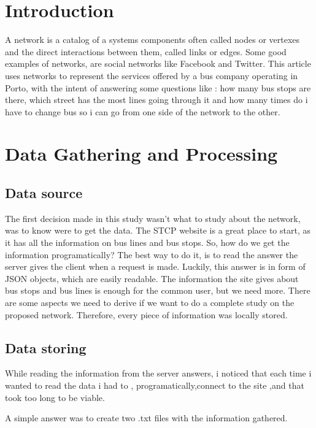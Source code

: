 \documentclass[12pt]{article}
\begin{document}
\begin{multicols}{2}
\section{Introduction}

A network is a catalog of a system\textsc{}s components often called nodes or vertexes and the direct interactions between them, called links or edges.
Some good examples of networks, are social networks like Facebook and Twitter.
This article uses networks to represent the services offered by a bus company operating in Porto, with the intent of answering some questions like : how many bus stops are there, which street has the most lines going through it and how many times do i have to change bus so i can go from one side of the network to the other. 
 

\section{Data Gathering and Processing}

\subsection{Data source}
The first decision made in this study wasn't what to study about the network, was to know were to get the data. 
The STCP website is a great place to start, as it has all the information on bus lines and bus stops. So, how do we get the information programatically?
The best way to do it, is to read the answer the server gives the client when a request is made. Luckily, this answer is in form of JSON objects, which are easily readable.
The information the site gives about bus stops and bus lines is enough for the common user, but we need more. There are some aspects we need to derive if we want to do a complete study on the proposed network. Therefore, every piece of information was locally stored.

\subsection{Data storing}
While reading the information from the server answers, i noticed that each time i wanted to read the data i had to , programatically,connect to the site ,and that took too long to be viable. 

A simple answer was to create two .txt files with the information gathered.


\end{multicols}
\end{document}
